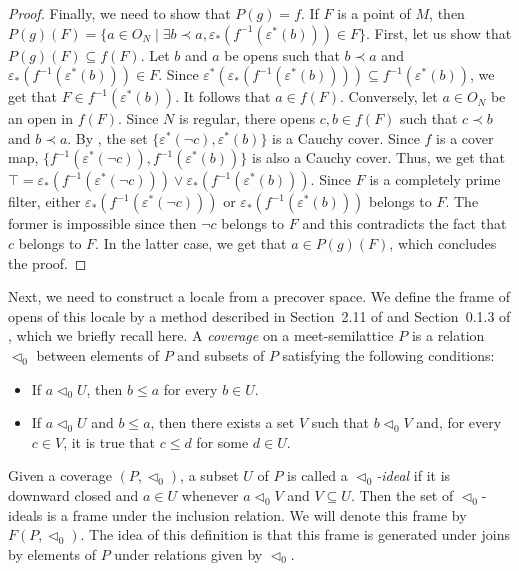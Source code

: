 \documentclass[reqno]{amsart}
\theoremstyle{definition}
\theoremstyle{remark}
\numberwithin{figure}{section}
\newcommand{\rb}{\prec}
\begin{document}
\begin{proof}
Finally, we need to show that $P(g) = f$.
If $F$ is a point of $M$, then $P(g)(F) = \{ a \in O_N \mid \exists b \rb a, \varepsilon_*(f^{-1}(\varepsilon^*(b))) \in F \}$.
First, let us show that $P(g)(F) \subseteq f(F)$.
Let $b$ and $a$ be opens such that $b \rb a$ and $\varepsilon_*(f^{-1}(\varepsilon^*(b))) \in F$.
Since $\varepsilon^*(\varepsilon_*(f^{-1}(\varepsilon^*(b)))) \subseteq f^{-1}(\varepsilon^*(b))$, we get that $F \in f^{-1}(\varepsilon^*(b))$.
It follows that $a \in f(F)$.
Conversely, let $a \in O_N$ be an open in $f(F)$.
Since $N$ is regular, there opens $c,b \in f(F)$ such that $c \rb b$ and $b \rb a$.
By , the set $\{ \varepsilon^*(\neg c), \varepsilon^*(b) \}$ is a Cauchy cover.
Since $f$ is a cover map, $\{ f^{-1}(\varepsilon^*(\neg c)), f^{-1}(\varepsilon^*(b)) \}$ is also a Cauchy cover.
Thus, we get that $\top = \varepsilon_*(f^{-1}(\varepsilon^*(\neg c))) \vee \varepsilon_*(f^{-1}(\varepsilon^*(b)))$.
Since $F$ is a completely prime filter, either $\varepsilon_*(f^{-1}(\varepsilon^*(\neg c)))$ or $\varepsilon_*(f^{-1}(\varepsilon^*(b)))$ belongs to $F$.
The former is impossible since then $\neg c$ belongs to $F$ and this contradicts the fact that $c$ belongs to $F$.
In the latter case, we get that $a \in P(g)(F)$, which concludes the proof.
\end{proof}

Next, we need to construct a locale from a precover space.
We define the frame of opens of this locale by a method described in Section~2.11 of \cite{stone-spaces} and Section~0.1.3 of \cite{locales-tychonoff}, which we briefly recall here.
A \emph{coverage} on a meet-semilattice $P$ is a relation $\triangleleft_0$ between elements of $P$ and subsets of $P$ satisfying the following conditions:
\begin{itemize}
\item If $a \triangleleft_0 U$, then $b \leq a$ for every $b \in U$.
\item If $a \triangleleft_0 U$ and $b \leq a$, then there exists a set $V$ such that $b \triangleleft_0 V$ and, for every $c \in V$, it is true that $c \leq d$ for some $d \in U$.
\end{itemize}
Given a coverage $(P,\triangleleft_0)$, a subset $U$ of $P$ is called a \emph{$\triangleleft_0$-ideal} if it is downward closed and $a \in U$ whenever $a \triangleleft_0 V$ and $V \subseteq U$.
Then the set of $\triangleleft_0$-ideals is a frame under the inclusion relation.
We will denote this frame by $F(P,\triangleleft_0)$.
The idea of this definition is that this frame is generated under joins by elements of $P$ under relations given by $\triangleleft_0$.
\end{document}
